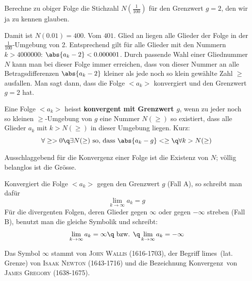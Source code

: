 \documentclass[%
11pt,%
twoside,%
titlepage,%
german,%
headsepline%
]{scrartcl}
\begin{document}
\begin{ueb}[Stichzahl]
Berechne zu obiger Folge die Stichzahl $N(\frac{1}{100})$ f\"ur den Grenzwert $g=2$, den wir ja zu kennen glauben.
\end{ueb}

Damit ist $N(0.01) = 400$. Vom $401.$ Glied an liegen alle
Glieder der Folge in der $\frac{1}{100}$-Umgebung von 2. Entsprechend gilt f\"ur alle Glieder mit den Nummern $k > 4000000$: $\abs{a_k - 2} < 0.000001$. Durch passende Wahl einer Gliednummer $N$ kann man bei dieser Folge immer erreichen, dass von dieser Nummer an alle Betragsdifferenzen $\abs{a_k - 2}$ kleiner als jede noch so klein gew\"ahlte Zahl $\ge$ ausfallen. Man sagt dann, dass
die Folge $<a_k>$ konvergiert und den
Grenzwert $g=2$ hat.

\begin{cdef}[Konvergenz]{}
Eine
Folge $<a_k>$ heisst \textbf{konvergent mit Grenzwert $g$}, wenn zu jeder noch so kleinen $\ge$-Umgebung von $g$ eine Nummer $N(\ge)$ so existiert, dass alle Glieder $a_k$ mit $k > N(\ge)$ in dieser Umgebung liegen. Kurz:
$$\forall\ge>0\q\exists N(\ge)\text{ so, dass }\abs{a_k-g}<\ge\q\forall k>N(\ge)$$
\end{cdef}

\begin{bem}
Ausschlaggebend f\"ur die Konvergenz einer Folge ist die Existenz von $N$; v\"ollig belanglos ist die Gr\"osse.
\end{bem}

\begin{bem}
Konvergiert die Folge $<a_k>$ gegen den Grenzwert $g$ (Fall A), so schreibt man daf\"ur
$$\lim_{k\to\infty}a_k=g$$
F\"ur die divergenten Folgen, deren Glieder gegen $\infty$ oder gegen $-\infty$ streben (Fall B), benutzt man die gleiche Symbolik und schreibt:
$$\lim_{k\to\infty}a_k=\infty\q\text { bzw. }\q\lim_{k\to\infty}a_k=-\infty$$
\end{bem}
Das Symbol $\infty$ stammt von \textsc{John Wallis} (1616-1703), der Begriff \glqq limes\grqq\ (lat. Grenze) von \textsc{Isaak Newton} (1643-1716) und die Bezeichnung \glqq Konvergenz\grqq\ von \textsc{James Gregory} (1638-1675).
\end{document}
